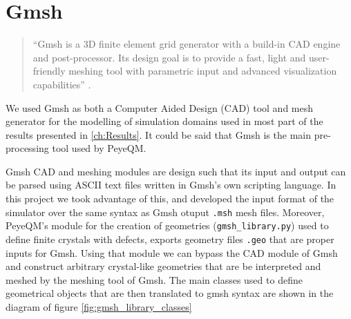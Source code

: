 \section{Gmsh}
\begin{quote}
``Gmsh is a 3D finite element grid generator with a build-in CAD engine and post-processor. Its design goal is to provide a fast, light and user-friendly meshing tool with parametric input and advanced visualization capabilities'' \cite{Geuzaine2009}. 
\end{quote}
We used Gmsh as both a Computer Aided Design (CAD) tool and mesh generator for the modelling of simulation domains used in most part of the results presented in \ref{ch:Results}. It could be said that Gmsh is the main pre-processing tool used by PeyeQM.

Gmsh CAD and meshing modules are design such that its input and output can be parsed using ASCII text files written in Gmsh's own scripting language. In this project we took advantage of this, and developed the input format of the simulator over the same syntax as Gmsh otuput \verb|.msh| mesh files. Moreover, PeyeQM's module for the creation of geometries (\verb|gmsh_library.py|) used to define finite crystals with defects, exports geometry files \verb|.geo| that   are proper inputs for Gmsh. Using that module we can bypass the CAD module of Gmsh and construct arbitrary crystal-like geometries that are be interpreted and meshed by the meshing tool of Gmsh. The main classes used to define geometrical objects that are then translated to gmsh syntax are shown in the diagram of figure \ref{fig:gmsh_library_classes}


